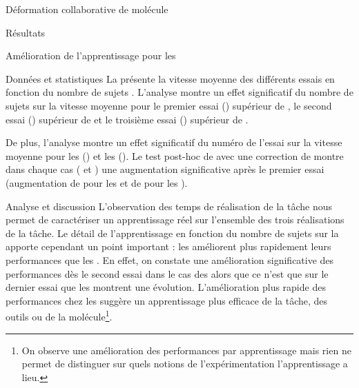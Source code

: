 \documentclass[myfrancais,ngerman,english,frenchb]{mythesis}
\begin{document}
\begin{mychapter}{Déformation collaborative de molécule}
\begin{mysection}{Résultats}
\begin{mysubsection}{Amélioration de l'apprentissage pour les }
\begin{mysubsubsection}{Données et statistiques}
					La  présente la vitesse moyenne  des différents essais  en fonction du nombre de sujets .
					L'analyse montre un effet significatif du nombre de sujets  sur la vitesse moyenne  pour le premier essai () supérieur de , le second essai () supérieur de  et le troisième essai () supérieur de .

					De plus, l'analyse montre un effet significatif du numéro de l'essai  sur la vitesse moyenne  pour les  () et les  ().
					Le test post-hoc de  avec une correction de  montre dans chaque cas ( et ) une augmentation significative après le premier essai (augmentation de  pour les  et de  pour les ).
				\end{mysubsubsection}
				\begin{mysubsubsection}{Analyse et discussion}
					L'observation des temps de réalisation de la tâche  nous permet de caractériser un apprentissage réel sur l'ensemble des trois réalisations de la tâche.
					Le détail de l'apprentissage en fonction du nombre de sujets sur la  apporte cependant un point important : les  améliorent plus rapidement leurs performances que les .
					En effet, on constate une amélioration significative des performances dès le second essai dans le cas des  alors que ce n'est que sur le dernier essai que les  montrent une évolution.
					L'amélioration plus rapide des performances chez les  suggère un apprentissage plus efficace de la tâche, des outils ou de la molécule\footnote{On observe une amélioration des performances par apprentissage mais rien ne permet de distinguer sur quels notions de l'expérimentation l'apprentissage a lieu.}.


\end{mysubsubsection}
\end{mysubsection}
\end{mysection}
\end{mychapter}
\end{document}
